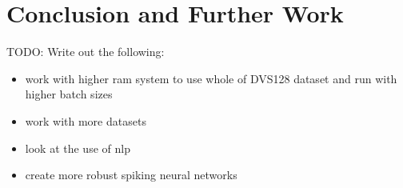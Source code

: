 \chapter{Conclusion and Further Work} \label{chap:conclusion_and_further_work}

\color{red} TODO: Write out the following:

\begin{itemize}
    \item work with higher ram system to use whole of DVS128 dataset and run with higher batch sizes
    \item work with more datasets
    \item look at the use of nlp
    \item create more robust spiking neural networks
\end{itemize}

\color{black}